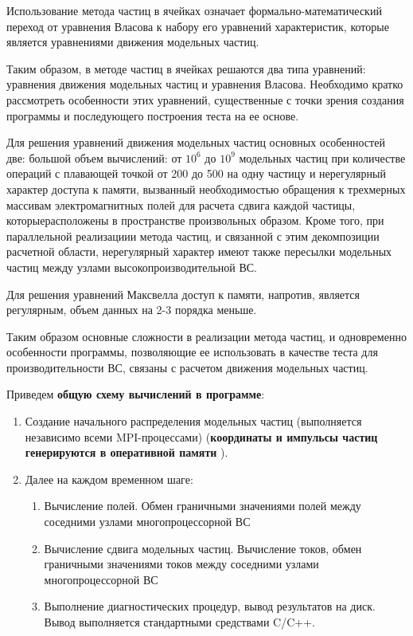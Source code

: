 Использование метода частиц в ячейках означает формально-математический переход от уравнения Власова к набору его уравнений характеристик, которые является уравнениями движения модельных частиц.

Таким образом, в методе частиц в ячейках решаются два типа уравнений: уравнения движения модельных частиц и уравнения Власова. Необходимо кратко рассмотреть особенности этих уравнений, существенные с точки зрения создания программы и последующего построения теста на ее основе.

Для решения уравнений движения модельных частиц основных особенностей две: большой объем вычислений: от $10^6$ до $10^9$
модельных частиц при количестве операций с плавающей точкой от 200 до 500 на одну частицу и нерегулярный характер доступа к памяти, вызванный необходимостью обращения к трехмерных массивам электромагнитных полей для расчета сдвига каждой частицы, которыерасположены в пространстве произвольных образом. Кроме того, при параллельной реализациии метода частиц, и связанной с этим декомпозиции расчетной области, нерегулярный характер имеют также пересылки модельных частиц между узлами высокопроизводительной ВС.

Для решения уравнений Максвелла доступ к памяти, напротив, является регулярным, объем данных на 2-3 порядка меньше. 


Таким образом основные сложности в реализации метода частиц, и одновременно особенности программы, позволяющие ее использовать в качестве теста для производительности ВС, связаны с расчетом движения модельных частиц.%

Приведем \textbf{общую схему вычислений в программе}:
\begin{enumerate}
	\item Создание начального 
	распределения модельных частиц
	(выполняется независимо 
	всеми MPI-процессами) (\textbf{координаты и импульсы частиц генерируются в оперативной памяти} ). 
	\item Далее на каждом временном шаге:
	\begin{enumerate}
		\item Вычисление полей. Обмен граничными значениями полей между соседними узлами многопроцессорной ВС
		\item Вычисление сдвига модельных частиц. Вычисление токов, обмен граничными значениями токов между соседними узлами многопроцессорной ВС
		\item Выполнение диагностических процедур, вывод результатов на диск. Вывод выполняется стандартными средствами C/C++.
	\end{enumerate}	
\end{enumerate}

